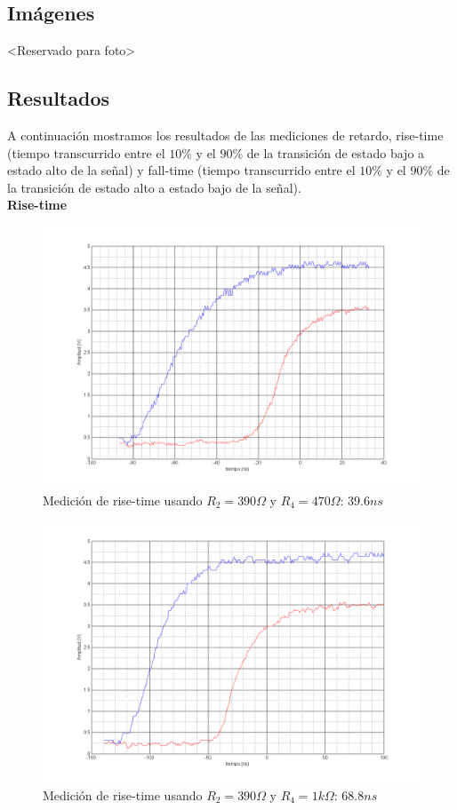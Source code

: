 \documentclass[12pt,a4paper]{article}
\begin{document}
\subsection{Imágenes}

<Reservado para foto>

\subsection{Resultados}

A continuación mostramos los resultados de las mediciones de retardo, rise-time (tiempo transcurrido entre el $10\%$ y el $90\%$ de la transición de estado bajo a estado alto de la señal) y fall-time (tiempo transcurrido entre el $10\%$ y el $90\%$ de la transición de estado alto a estado bajo de la señal).\\

\textbf{Rise-time}

\begin{figure}[H]
\centering
\includegraphics[width=\textwidth]{img/RT1.png}
\caption{Medición de rise-time usando $R_2=390\Omega$ y $R_4=470\Omega$: $39.6ns$}
\end{figure}

\begin{figure}[H]
\centering
\includegraphics[width=\textwidth]{img/RT2.png}
\caption{Medición de rise-time usando $R_2=390\Omega$ y $R_4=1k\Omega$: $68.8ns$}
\end{figure}
\end{document}
